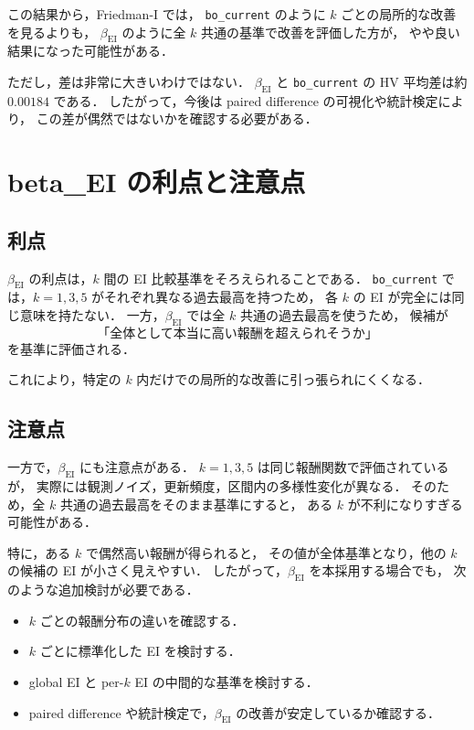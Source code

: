 \documentclass[a4paper,11pt]{ltjsarticle}
\begin{document}
この結果から，Friedman-I では，
\texttt{bo\_current} のように \(k\) ごとの局所的な改善を見るよりも，
\(\beta_{\mathrm{EI}}\) のように全 \(k\) 共通の基準で改善を評価した方が，
やや良い結果になった可能性がある．

ただし，差は非常に大きいわけではない．
\(\beta_{\mathrm{EI}}\) と \texttt{bo\_current} の HV 平均差は約 \(0.00184\) である．
したがって，今後は paired difference の可視化や統計検定により，
この差が偶然ではないかを確認する必要がある．

\section{beta\_EI の利点と注意点}

\subsection{利点}

\(\beta_{\mathrm{EI}}\) の利点は，\(k\) 間の EI 比較基準をそろえられることである．
\texttt{bo\_current} では，\(k=1,3,5\) がそれぞれ異なる過去最高を持つため，
各 \(k\) の EI が完全には同じ意味を持たない．
一方，\(\beta_{\mathrm{EI}}\) では全 \(k\) 共通の過去最高を使うため，
候補が
\[
  \text{「全体として本当に高い報酬を超えられそうか」}
\]
を基準に評価される．

これにより，特定の \(k\) 内だけでの局所的な改善に引っ張られにくくなる．

\subsection{注意点}

一方で，\(\beta_{\mathrm{EI}}\) にも注意点がある．
\(k=1,3,5\) は同じ報酬関数で評価されているが，
実際には観測ノイズ，更新頻度，区間内の多様性変化が異なる．
そのため，全 \(k\) 共通の過去最高をそのまま基準にすると，
ある \(k\) が不利になりすぎる可能性がある．

特に，ある \(k\) で偶然高い報酬が得られると，
その値が全体基準となり，他の \(k\) の候補の EI が小さく見えやすい．
したがって，\(\beta_{\mathrm{EI}}\) を本採用する場合でも，
次のような追加検討が必要である．

\begin{itemize}
  \item \(k\) ごとの報酬分布の違いを確認する．
  \item \(k\) ごとに標準化した EI を検討する．
  \item global EI と per-\(k\) EI の中間的な基準を検討する．
  \item paired difference や統計検定で，\(\beta_{\mathrm{EI}}\) の改善が安定しているか確認する．
\end{itemize}
\end{document}
